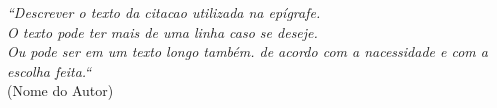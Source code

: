\thispagestyle{empty}
\begin{spacing}{1}
\vspace*{\fill}
\begin{quoting}[leftmargin=6cm, rightmargin=1cm]

\textit{``Descrever o texto da citacao utilizada na epígrafe.\\
O texto pode ter mais de uma linha caso se deseje. \\
Ou pode ser em um texto longo também. de acordo com a nacessidade e com a escolha feita.``\\}
(Nome do Autor)
\end{quoting}
\end{spacing}
\newpage




